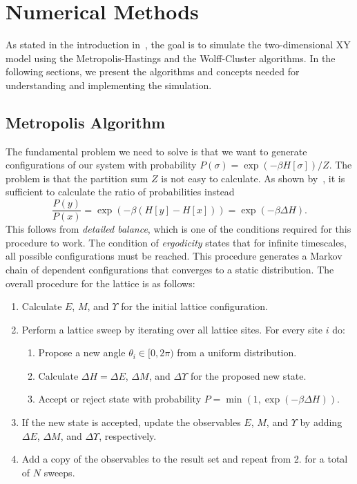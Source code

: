 \section{Numerical Methods}\label{sec:theo:numerical_methods}
	As stated in the introduction in~, the goal is to simulate the two-dimensional XY model using the Metropolis-Hastings and the Wolff-Cluster algorithms. In the following sections, we present the algorithms and concepts needed for understanding and implementing the simulation.

	\subsection{Metropolis Algorithm}\label{sec:theo:metropolis}
		The fundamental problem we need to solve is that we want to generate configurations of our system with probability $P(\sigma) = \exp{(-\beta H[\sigma])}/Z$. The problem is that the partition sum $Z$ is not easy to calculate. As shown by~\citet{metropolis}, it is sufficient to calculate the ratio of probabilities instead
		\begin{equation}
			\frac{P(y)}{P(x)} = \exp{(-\beta(H[y] - H[x]))} = \exp{(-\beta \Delta H)}.
		\end{equation}
		This follows from \emph{detailed balance}, which is one of the conditions required for this procedure to work. The condition of \emph{ergodicity} states that for infinite timescales, all possible configurations must be reached. This procedure generates a Markov chain of dependent configurations that converges to a static distribution. The overall procedure for the lattice is as follows:
		\begin{enumerate}
			\item Calculate $E$, $M$, and $\Upsilon$ for the initial lattice configuration.
			\item Perform a lattice sweep by iterating over all lattice sites. For every site $i$ do:
			\begin{enumerate}
				\item Propose a new angle $\theta_i \in [0,2\pi)$ from a uniform distribution.
				\item Calculate $\Delta H = \Delta E$, $\Delta M$, and $\Delta \Upsilon$ for the proposed new state.
				\item Accept or reject state with probability $P = \min{(1, \exp{(-\beta\Delta H)})}$.
			\end{enumerate}
			\item If the new state is accepted, update the observables $E$, $M$, and $\Upsilon$ by adding $\Delta E$, $\Delta M$, and $\Delta \Upsilon$, respectively.
			\item Add a copy of the observables to the result set and repeat from 2. for a total of $N$ sweeps.
		\end{enumerate}
		
